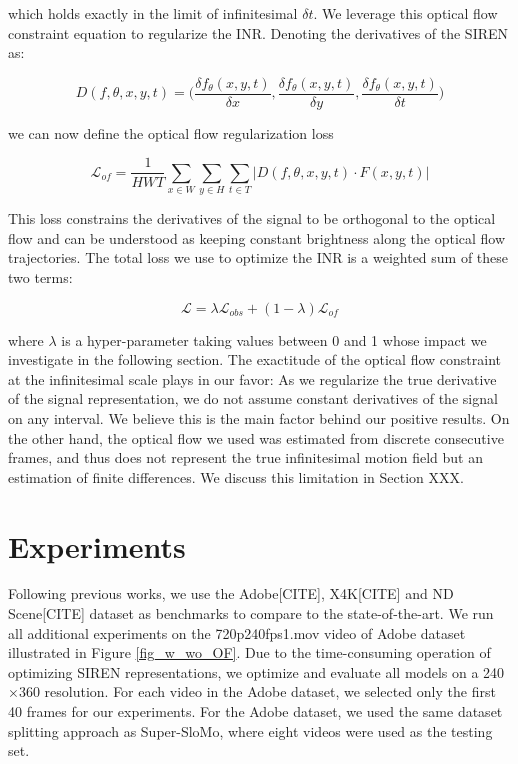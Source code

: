 \documentclass{article}
\begin{document}
which holds exactly in the limit of infinitesimal $\delta t$.
We leverage this optical flow constraint equation to regularize the INR.
Denoting the derivatives of the SIREN as:

\begin{equation}
D(f, \theta, x, y, t)=\Big(\frac{\delta f_{\theta}(x,y,t)}{\delta x}, \frac{\delta f_{\theta}(x,y,t)}{\delta y}, \frac{\delta f_{\theta}(x,y,t)}{\delta t}\Big)
\end{equation}

we can now define the optical flow regularization loss

\begin{equation}
\mathcal{L}_{of} = \frac{1}{HWT} \sum_{x \in W}\sum_{y \in H}\sum_{t \in T} | D(f, \theta, x, y, t) \cdot F(x, y, t) |
\end{equation}

This loss constrains the derivatives of the signal to be orthogonal to the optical flow and
can be understood as keeping constant brightness along the optical flow trajectories.
The total loss we use to optimize the INR is a weighted sum of these two terms:

\begin{equation}
\mathcal{L} = \lambda \mathcal{L}_{obs} + (1-\lambda) \mathcal{L}_{of}
\end{equation}

where $\lambda$ is a hyper-parameter taking values between 0 and 1 whose impact we investigate in the following section.
The exactitude of the optical flow constraint at the infinitesimal scale plays in our favor:
As we regularize the true derivative of the signal representation,
we do not assume constant derivatives of the signal on any interval.
We believe this is the main factor behind our positive results.
On the other hand, the optical flow we used was estimated from discrete consecutive frames,
and thus does not represent the true infinitesimal motion field but an estimation of finite differences.
We discuss this limitation in Section XXX.

\section{Experiments}

Following previous works, we use the Adobe[CITE], X4K[CITE] and ND Scene[CITE] dataset as benchmarks to compare to the state-of-the-art.
We run all additional experiments on the 720p240fps1.mov video of Adobe dataset illustrated in Figure \ref{fig_w_wo_OF}.
Due to the time-consuming operation of optimizing SIREN representations, we optimize and evaluate all models on a 240$\times$360 resolution.
For each video in the Adobe dataset, we selected only the first 40 frames for our experiments.
For the Adobe dataset, we used the same dataset splitting approach as Super-SloMo, where eight videos were used as the testing set.
\end{document}
